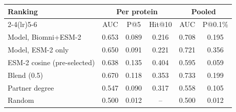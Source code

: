 \begin{tabular}{lccccc}
\toprule
Ranking & \multicolumn{3}{c}{Per protein} & \multicolumn{2}{c}{Pooled} \\
\cmidrule(lr){2-4}\cmidrule(lr){5-6}
 & AUC & P@5 & Hit@10 & AUC & P@0.1\% \\
\midrule
Model, Biomni+ESM-2 & 0.653 & 0.089 & 0.216 & 0.708 & 0.195 \\
Model, ESM-2 only & 0.650 & 0.091 & 0.221 & 0.721 & 0.356 \\
ESM-2 cosine (pre-selected) & 0.638 & 0.135 & 0.404 & 0.595 & 0.059 \\
Blend (0.5) & 0.670 & 0.118 & 0.353 & 0.733 & 0.199 \\
Partner degree & 0.547 & 0.090 & 0.317 & 0.558 & 0.105 \\
Random & 0.500 & 0.012 & -- & 0.500 & 0.012 \\
\bottomrule
\end{tabular}
